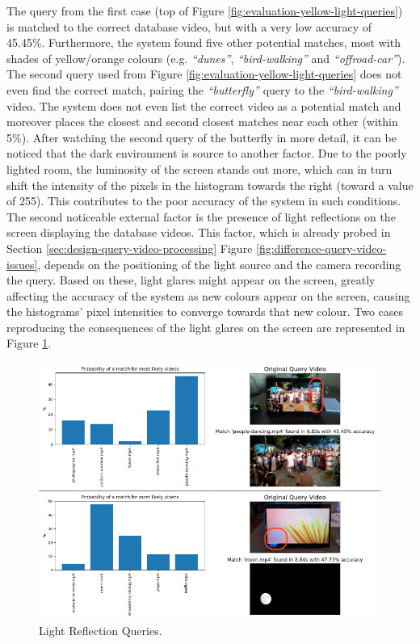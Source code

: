 The query from the first case (top of Figure \ref{fig:evaluation-yellow-light-queries}) is matched to the correct database video, but with a very low accuracy of 45.45\%. Furthermore, the system found five other potential matches, most with shades of yellow/orange colours (e.g. \textit{``dunes''}, \textit{``bird-walking''} and \textit{``offroad-car''}). The second query used from Figure \ref{fig:evaluation-yellow-light-queries} does not even find the correct match, pairing the \textit{``butterfly''} query to the \textit{``bird-walking''} video. The system does not even list the correct video as a potential match and moreover places the closest and second closest matches near each other (within 5\%). After watching the second query of the butterfly in more detail, it can be noticed that the dark environment is source to another factor. Due to the poorly lighted room, the luminosity of the screen stands out more, which can in turn shift the intensity of the pixels in the histogram towards the right (toward a value of 255). This contributes to the poor accuracy of the system in such conditions.\\

The second noticeable external factor is the presence of light reflections on the screen displaying the database videos. This factor, which is already probed in Section \ref{sec:design-query-video-processing} Figure \ref{fig:difference-query-video-issues}, depends on the positioning of the light source and the camera recording the query. Based on these, light glares might appear on the screen, greatly affecting the accuracy of the system as new colours appear on the screen, causing the histograms' pixel intensities to converge towards that new colour. Two cases reproducing the consequences of the light glares on the screen are represented in Figure \ref{fig:evaluation-light-reflection-queries}. %

\begin{figure}[h] 
\centerline{\includegraphics[width=\textwidth]{figures/evaluation/light-reflection-queries.png}}
\caption{\label{fig:evaluation-light-reflection-queries}Light Reflection Queries.}
\end{figure}

